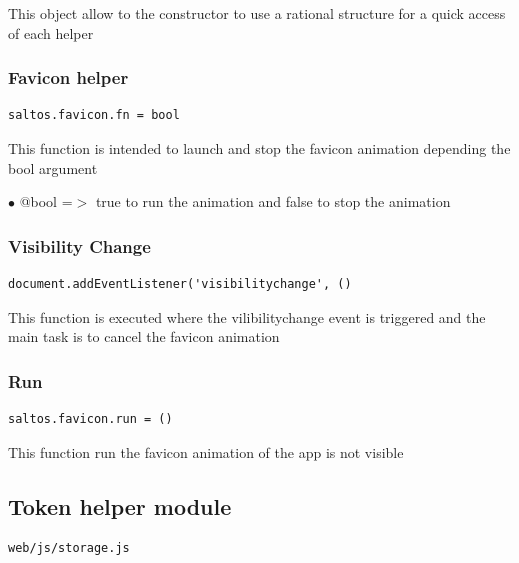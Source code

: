 \documentclass[a4paper]{article}
\begin{document}
This object allow to the constructor to use a rational structure for a quick access of each
helper

\hypertarget{toc283}{}
\subsubsection{Favicon helper}

\begin{lstlisting}
saltos.favicon.fn = bool
\end{lstlisting}

This function is intended to launch and stop the favicon animation depending
the bool argument

\begin{compactitem}
\item[\color{myblue}$\bullet$] @bool =$>$ true to run the animation and false to stop the animation
\end{compactitem}

\hypertarget{toc284}{}
\subsubsection{Visibility Change}

\begin{lstlisting}
document.addEventListener('visibilitychange', ()
\end{lstlisting}

This function is executed where the vilibilitychange event is triggered and
the main task is to cancel the favicon animation

\hypertarget{toc285}{}
\subsubsection{Run}

\begin{lstlisting}
saltos.favicon.run = ()
\end{lstlisting}

This function run the favicon animation of the app is not visible

\hypertarget{toc286}{}
\subsection{Token helper module}

\begin{lstlisting}
web/js/storage.js
\end{lstlisting}
\end{document}
